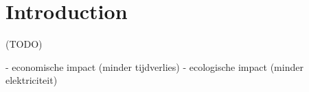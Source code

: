 \chapter{Introduction}
(TODO)

- economische impact (minder tijdverlies)
- ecologische impact (minder elektriciteit)